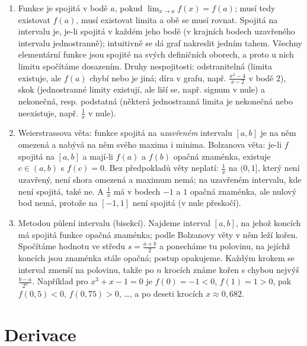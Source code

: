 \begin{enumerate}[label=\textbf{\arabic*.}, leftmargin=*, itemsep=0.8em]
  \item {}
  Funkce je spojitá v bodě $a$, pokud $\lim_{x\to a} f(x) = f(a)$; musí tedy existovat $f(a)$, musí existovat limita a obě se musí rovnat. Spojitá na intervalu je, je-li spojitá v každém jeho bodě (v krajních bodech uzavřeného intervalu jednostranně); intuitivně se dá graf nakreslit jedním tahem. Všechny elementární funkce jsou spojité na svých definičních oborech, a proto u nich limitu spočítáme dosazením. Druhy nespojitosti: odstranitelná (limita existuje, ale $f(a)$ chybí nebo je jiná; díra v grafu, např. $\frac{x^2 - 4}{x - 2}$ v bodě $2$), skok (jednostranné limity existují, ale liší se, např. signum v nule) a nekonečná, resp. podstatná (některá jednostranná limita je nekonečná nebo neexistuje, např. $\frac{1}{x}$ v nule). 

  \item {}
  Weierstrassova věta: funkce spojitá na \emph{uzavřeném} intervalu $[a, b]$ je na něm omezená a nabývá na něm svého maxima i minima. Bolzanova věta: je-li $f$ spojitá na $[a, b]$ a mají-li $f(a)$ a $f(b)$ opačná znaménka, existuje $c\in(a, b)$ s $f(c) = 0$. Bez předpokladů věty neplatí: $\frac{1}{x}$ na $(0, 1]$, který není uzavřený, není shora omezená a maximum nemá; na uzavřeném intervalu, kde není spojitá, také ne. A $\frac{1}{x}$ má v bodech $-1$ a $1$ opačná znaménka, ale nulový bod nemá, protože na $[-1, 1]$ není spojitá (v nule přeskočí). 

  \item {}
  Metodou půlení intervalu (bisekcí). Najdeme interval $[a, b]$, na jehož koncích má spojitá funkce opačná znaménka; podle Bolzanovy věty v něm leží kořen. Spočítáme hodnotu ve středu $s = \frac{a + b}{2}$ a ponecháme tu polovinu, na jejíchž koncích jsou znaménka stále opačná; postup opakujeme. Každým krokem se interval zmenší na polovinu, takže po $n$ krocích známe kořen s chybou nejvýš $\frac{b - a}{2^n}$. Například pro $x^3 + x - 1 = 0$ je $f(0) = -1 < 0$, $f(1) = 1 > 0$, pak $f(0{,}5) < 0$, $f(0{,}75) > 0$, \ldots, a po deseti krocích $x\approx 0{,}682$. 
\end{enumerate}

\section{Derivace}

